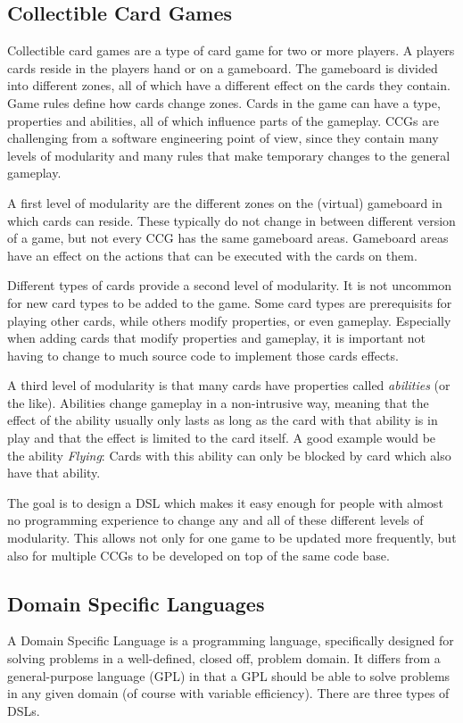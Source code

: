 \subsection{Collectible Card Games}
\label{CCGs}
Collectible card games are a type of card game for two or more players. A players cards reside in the players hand or on a gameboard. The gameboard is divided into different zones, all of which have a different effect on the cards they contain. Game rules define how cards change zones. Cards in the game can have a type, properties and abilities, all of which influence parts of the gameplay. CCGs are challenging from a software engineering point of view, since they contain many levels of modularity and many rules that make temporary changes to the general gameplay.

A first level of modularity are the different zones on the (virtual) gameboard in which cards can reside. These typically do not change in between different version of a game, but not every CCG has the same gameboard areas. Gameboard areas have an effect on the actions that can be executed with the cards on them.

Different types of cards provide a second level of modularity. It is not uncommon for new card types to be added to the game. Some card types are prerequisits for playing other cards, while others modify properties, or even gameplay. Especially when adding cards that modify properties and gameplay, it is important not having to change to much source code to implement those cards effects.

A third level of modularity is that many cards have properties called \textit{abilities} (or the like). Abilities change gameplay in a non-intrusive way, meaning that the effect of the ability usually only lasts as long as the card with that ability is in play and that the effect is limited to the card itself. A good example would be the ability \textit{Flying}: Cards with this ability can only be blocked by card which also have that ability.

The goal is to design a DSL which makes it easy enough for people with almost no programming experience to change any and all of these different levels of modularity. This allows not only for one game to be updated more frequently, but also for multiple CCGs to be developed on top of the same code base.
\subsection{Domain Specific Languages}
\label{DSLs}
A Domain Specific Language is a programming language, specifically designed for solving problems in a well-defined, closed off, problem domain. It differs from a general-purpose language (GPL) in that a GPL should be able to solve problems in any given domain (of course with variable efficiency). There are three types of DSLs.

